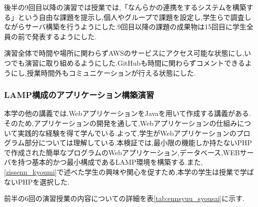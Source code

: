 \documentclass[11pt, a4paper]{jreport}
\begin{document}
後半の9回目以降の演習では授業では,「なんらかの連携をするシステムを構築する」という自由な課題を提示し,個人やグループで課題を設定し,学生らで調査しながらサーバ構築を行うようにした.9回目以降の課題の成果物は15回目に学生全員の前で発表するようにした.

演習全体で時間や場所に関わらずAWSのサービスにアクセス可能な状態にし,いつでも演習に取り組めるようにした.GitHubも時間に関わらずコメントできるようにし,授業時間外もコミュニケーションが行える状態にした.

\subsubsection{LAMP構成のアプリケーション構築演習}\label{lamp_dis}

本学の他の講義では,WebアプリケーションをJavaを用いて作成する講義がある.そのため,アプリケーションの開発を通して,Webアプリケーションの仕組みについて実践的な経験を得て学んでいる.よって,学生がWebアプリケーションのプログラム部分については理解している.本検証では,最小限の機能しか持たないPHPで作成された簡単なプログラムのWebアプリケーション,データベース,WEBサーバを持つ基本的かつ最小構成であるLAMP環境を構築する.また,\ref{zissenn_kyoumi}で述べた学生の興味や関心を促すため,本学の学生は授業で学ばないPHPを選択した.

前半の6回の演習授業の内容についての詳細を表\ref{tab:ennsyuu_syousai}に示す.
\end{document}
